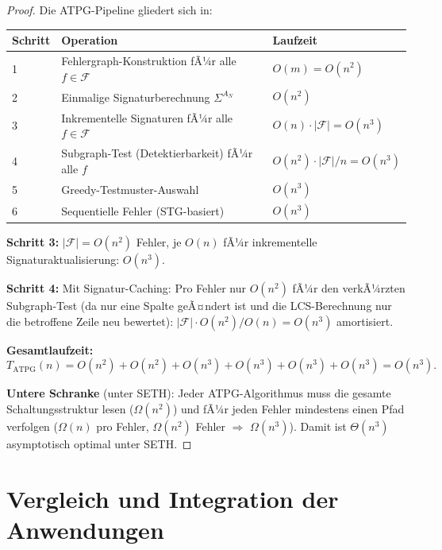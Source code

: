 ﻿\documentclass[a4paper,12pt]{article}
\theoremstyle{definition}
\begin{document}
\begin{proof}
  Die ATPG-Pipeline gliedert sich in:
  \begin{center}
  \begin{tabular}{lll}
    \toprule
    Schritt & Operation & Laufzeit \\
    \midrule
    1 & Fehlergraph-Konstruktion fÃ¼r alle $f \in \mathcal{F}$ & $O(m) = O(n^2)$ \\
    2 & Einmalige Signaturberechnung $\Sigma^{A_N}$ & $O(n^2)$ \\
    3 & Inkrementelle Signaturen fÃ¼r alle $f \in \mathcal{F}$ & $O(n) \cdot |\mathcal{F}| = O(n^3)$ \\
    4 & Subgraph-Test (Detektierbarkeit) fÃ¼r alle $f$  & $O(n^2) \cdot |\mathcal{F}|/n = O(n^3)$ \\
    5 & Greedy-Testmuster-Auswahl & $O(n^3)$ \\
    6 & Sequentielle Fehler (STG-basiert) & $O(n^3)$ \\
    \bottomrule
  \end{tabular}
  \end{center}

  \textbf{Schritt 3:} $|\mathcal{F}| = O(n^2)$ Fehler, je $O(n)$ fÃ¼r inkrementelle
  Signaturaktualisierung: $O(n^3)$.

  \textbf{Schritt 4:} Mit Signatur-Caching: Pro Fehler nur $O(n^2)$ fÃ¼r den verkÃ¼rzten
  Subgraph-Test (da nur eine Spalte geÃ¤ndert ist und die LCS-Berechnung nur die
  betroffene Zeile neu bewertet): $|\mathcal{F}| \cdot O(n^2) / O(n) = O(n^3)$ amortisiert.

  \textbf{Gesamtlaufzeit:}
  \[
    T_{\text{ATPG}}(n) = O(n^2) + O(n^2) + O(n^3) + O(n^3) + O(n^3) + O(n^3) = O(n^3).
  \]

  \textbf{Untere Schranke} (unter SETH): Jeder ATPG-Algorithmus muss die gesamte
  Schaltungsstruktur lesen ($\Omega(n^2)$) und fÃ¼r jeden Fehler mindestens einen
  Pfad verfolgen ($\Omega(n)$ pro Fehler, $\Omega(n^2)$ Fehler $\Rightarrow$
  $\Omega(n^3)$). Damit ist $\Theta(n^3)$ asymptotisch optimal unter SETH.
\end{proof}

\section{Vergleich und Integration der Anwendungen}
\end{document}
